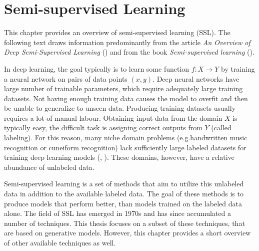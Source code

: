 \chapter{Semi-supervised Learning}
\label{chap:SemisupervisedLearning}

This chapter provides an overview of semi-supervised learning (SSL). The following text draws information predominantly from the article \emph{An Overview of Deep Semi-Supervised Learning} (\cite{SemisupervisedOverview}) and from the book \emph{Semi-supervised learning} (\cite{SslBook}).

In deep learning, the goal typically is to learn some function $f: X \rightarrow Y$ by training a neural network on pairs of data points $(x, y)$. Deep neural networks have large number of trainable parameters, which require adequately large training datasets. Not having enough training data causes the model to overfit and then be unable to generalize to unseen data. Producing training datasets usually requires a lot of manual labour. Obtaining input data from the domain $X$ is typically easy, the difficult task is assigning correct outputs from $Y$ (called labeling). For this reason, many niche domain problems (e.g.\@ handwritten music recognition or cuneiform recognition) lack sufficiently large labeled datasets for training deep learning models (\cite{MuscimaPP}, \cite{Cuneiforms}). These domains, however, have a relative abundance of unlabeled data.

Semi-supervised learning is a set of methods that aim to utilize this unlabeled data in addition to the available labeled data. The goal of these methods is to produce models that perform better, than models trained on the labeled data alone. The field of SSL has emerged in 1970s and has since accumulated a number of techniques. This thesis focuses on a subset of these techniques, that are based on generative models. However, this chapter provides a short overview of other available techniques as well.

